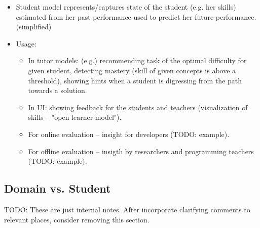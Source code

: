\begin{itemize}
\item Student model represents/captures
  state of the student (e.g. her skills)
  estimated from her past performance
  used to predict her future performance. (simplified)

\item Usage:
  \begin{itemize}
  \item In tutor models: (e.g.)
    recommending task of the optimal difficulty for given student,
    detecting mastery (skill of given concepts is above a threshold),
    showing hints when a student is digressing from the path towards a solution.
  \item In UI: showing feedback for the students and teachers
        \cite{instructor-dashboard-realtime}
        (visualization of skills -- "open learner model").
  \item For online evaluation -- insight for developers (TODO: example).
  \item For offline evaluation -- insigth by researchers and programming teachers
  (TODO: example).
  \end{itemize}
\end{itemize}


\subsection{Domain vs. Student}

TODO: These are just internal notes. After incorporate clarifying comments
to relevant places, consider removing this section.

